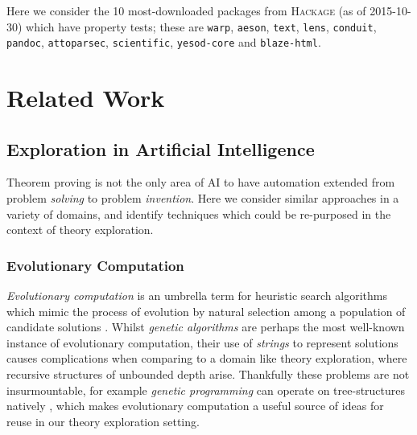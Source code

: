 \documentclass[]{article}
\begin{document}
Here we consider the 10 most-downloaded packages from \textsc{Hackage} (as of 2015-10-30) which have property tests; these are \texttt{warp}, \texttt{aeson}, \texttt{text}, \texttt{lens}, \texttt{conduit}, \texttt{pandoc}, \texttt{attoparsec}, \texttt{scientific}, \texttt{yesod-core} and \texttt{blaze-html}.


\section{Related Work}
\label{related}

\iffalse

\subsection{Conjecture Generation}

The task of \emph{conjecture generation} lies at the heart of theory exploration, and

\subsubsection{Lemma generation}

\fi

\subsection{Exploration in Artificial Intelligence}

Theorem proving is not the only area of AI to have automation extended from problem \emph{solving} to problem \emph{invention}. Here we consider similar approaches in a variety of domains, and identify techniques which could be re-purposed in the context of theory exploration.

\subsubsection{Evolutionary Computation}

\emph{Evolutionary computation} is an umbrella term for heuristic search algorithms which mimic the process of evolution by natural selection among a population of candidate solutions \cite{back1997evolutionary}. Whilst \emph{genetic algorithms} are perhaps the most well-known instance of evolutionary computation, their use of \emph{strings} to represent solutions causes complications when comparing to a domain like theory exploration, where recursive structures of unbounded depth arise. Thankfully these problems are not insurmountable, for example \emph{genetic programming} can operate on tree-structures natively \cite{banzhaf1998genetic}, which makes evolutionary computation a useful source of ideas for reuse in our theory exploration setting.
\end{document}
